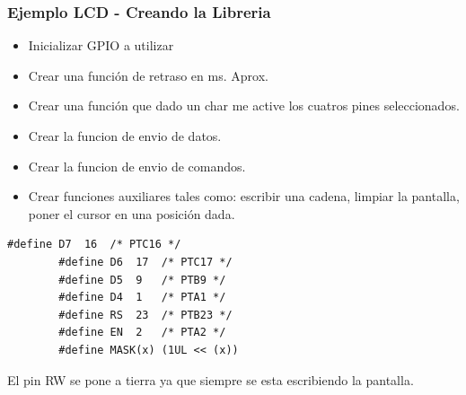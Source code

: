 \documentclass[10.5pt,scale=1.0,t,aspectratio=169,hyperref={pdfpagelabels=false}]{beamer}
\begin{document}
\begin{frame}[fragile]
	\frametitle{Ejemplo LCD - Creando la Libreria}
	\begin{itemize}
		\item Inicializar GPIO a utilizar
		\item Crear una función de retraso en ms. Aprox.
		\item Crear una función que dado un char me active los cuatros pines seleccionados. 
		\item Crear la funcion de envio de datos.
		\item Crear la funcion de envio de comandos. 
		\item Crear funciones auxiliares tales como: escribir una cadena, limpiar la pantalla, poner el cursor en una posición dada.
	\end{itemize}

	\begin{lstlisting}[style=CStyle]
		#define D7	16	/* PTC16 */
		#define D6	17	/* PTC17 */
		#define D5	9	/* PTB9 */
		#define D4	1	/* PTA1 */
		#define RS	23	/* PTB23 */
		#define EN	2	/* PTA2 */
		#define MASK(x) (1UL << (x))
	\end{lstlisting}
	El pin RW se pone a tierra ya que siempre se esta escribiendo la pantalla. 
\end{frame}
\end{document}

